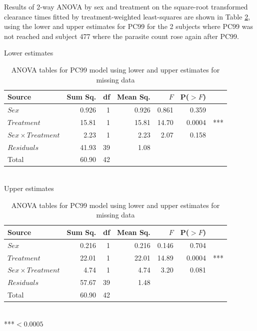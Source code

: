 Results of 2-way ANOVA by sex and treatment on the square-root transformed clearance times fitted by treatment-weighted least-squares are shown in Table \ref{aov99}, using the lower and upper estimates for PC99 for the 2 subjects where PC99 was not reached and subject 477 where the parasite count rose again after PC99.
\begin{table}[h]
\centering
\caption{ANOVA tables for PC99 model using lower and upper estimates for missing data}\label{aov99}
Lower estimates
\begin{tabular}{l|rrrrrl}
Source&Sum Sq.&df&Mean Sq.&$F$&P($>F$)\\
\hline
$Sex$				& 0.926 & 1 & 0.926 & 0.861 & 0.359 & \\
$Treatment$			& 15.81   & 1 & 15.81   & 14.70   & 0.0004 &*** \\
$Sex\times Treatment$	& 2.23   & 1 & 2.23   & 2.07   & 0.158 & \\
$Residuals$			& 41.93 & 39 & 1.08 &&&\\
\hline
Total&60.90&42&&&
\end{tabular}\\[1ex]
Upper estimates
\begin{tabular}{l|rrrrrl}
Source&Sum Sq.&df&Mean Sq.&$F$&P($>F$)\\
\hline
$Sex$				& 0.216 & 1 & 0.216 & 0.146 & 0.704 & \\
$Treatment$			& 22.01   & 1 & 22.01   & 14.89   & 0.0004 &*** \\
$Sex\times Treatment$	& 4.74   & 1 & 4.74   & 3.20   & 0.081 & \\
$Residuals$			& 57.67 & 39 & 1.48 &&&\\
\hline
Total&60.90&42&&&
\end{tabular}\\
\hspace{20em}***$<0.0005$
\end{table}

